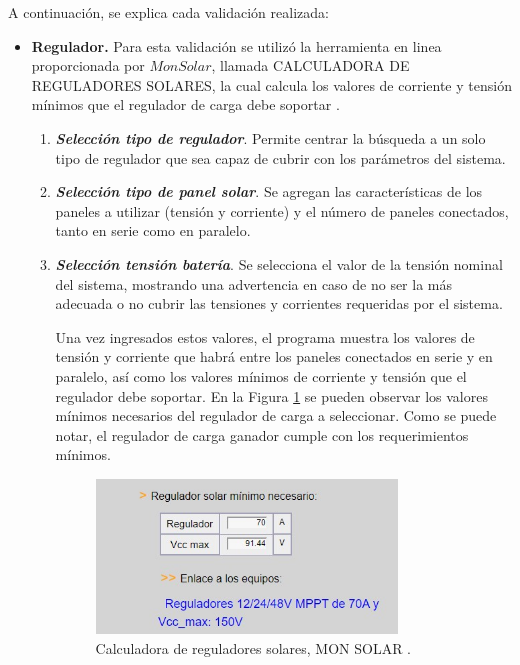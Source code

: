 A continuación, se explica cada validación realizada:

\begin{itemize}
	\item \textbf{Regulador.}
	Para esta validación se utilizó la herramienta en linea proporcionada por $ Mon Solar $, llamada CALCULADORA DE REGULADORES SOLARES, la cual calcula los valores de corriente y tensión mínimos que el regulador de carga debe soportar \cite{DDE9}. 
	\begin{enumerate}
		\item \textbf{\textit{Selección tipo de regulador}}. Permite centrar la búsqueda a un solo tipo de regulador que sea capaz de cubrir con los parámetros del sistema.
		\item \textbf{\textit{Selección tipo de panel solar}}. Se agregan las características de los paneles a utilizar (tensión y corriente) y el número de paneles conectados, tanto en serie como en paralelo.
		\item \textbf{\textit{Selección tensión batería}}. Se selecciona el valor de la tensión nominal del sistema, mostrando una advertencia en caso de no ser la más adecuada o no cubrir las tensiones y corrientes requeridas por el sistema. 
			
		Una vez ingresados estos valores, el programa muestra los valores de tensión y corriente que habrá entre los paneles conectados en serie y en paralelo, así como los valores mínimos de corriente y tensión que el regulador debe soportar. En la Figura \ref{fig:reguladorsel} se pueden observar los valores mínimos necesarios del regulador de carga a seleccionar. Como se puede notar, el regulador de carga ganador cumple con los requerimientos mínimos. 
		
		\begin{figure}[H]
		\centering
		\includegraphics[width=8cm]{imagenes/reguladorsel}
		\caption{Calculadora de reguladores solares, MON SOLAR \cite{DDE9}.}
		\label{fig:reguladorsel}
		\end{figure}
		
	\end{enumerate}
	

\end{itemize}

